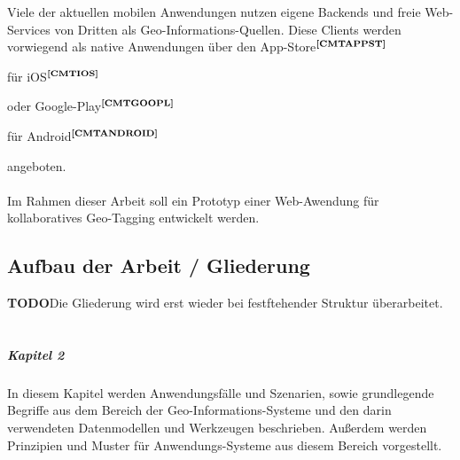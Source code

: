Viele der aktuellen mobilen Anwendungen nutzen eigene Backends und freie Web-Services von Dritten als Geo-Informations-Quellen. Diese Clients werden vorwiegend als native Anwendungen über den App-Store$^{\textbf{\ref{CMTAPPST}}}$%
\addtocounter{footnote}{1}%
 für iOS$^{\textbf{\ref{CMTIOS}}}$%
\addtocounter{footnote}{1}%
 oder Google-Play$^{\textbf{\ref{CMTGOOPL}}}$%
\addtocounter{footnote}{1}%
 für Android$^{\textbf{\ref{CMTANDROID}}}$%
\addtocounter{footnote}{1}%
 angeboten.%
 \\ \\
Im Rahmen dieser Arbeit soll ein Prototyp einer Web-Awendung für kollaboratives Geo-Tagging entwickelt werden.%

\subsection{Aufbau der Arbeit / Gliederung}

\textbf{TODO}Die Gliederung wird erst wieder bei festftehender Struktur überarbeitet.\\ \\

\subparagraph{Kapitel 2}
In diesem Kapitel werden Anwendungsfälle und Szenarien, sowie grundlegende Begriffe aus dem Bereich der Geo-Informations-Systeme und den darin verwendeten Datenmodellen und Werkzeugen beschrieben. Außerdem werden Prinzipien und Muster für Anwendungs-Systeme aus diesem Bereich vorgestellt. 

